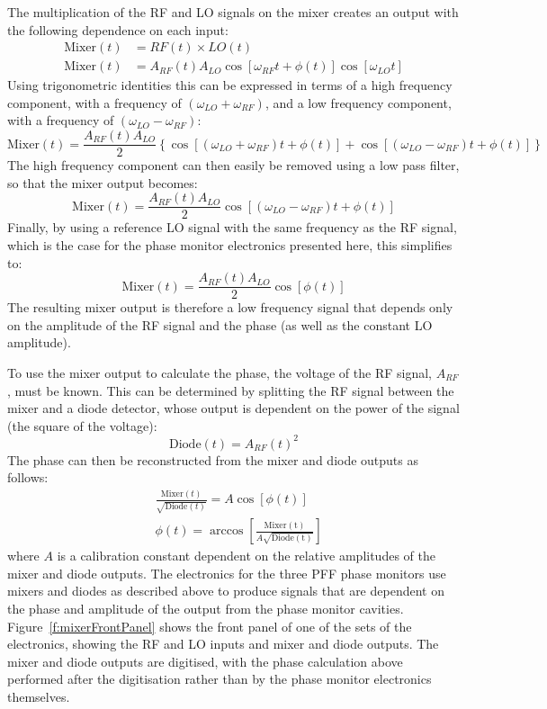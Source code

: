 The multiplication of the RF and LO signals on the mixer creates an output with the following dependence on each input:
\begin{align}
\mathrm{Mixer}(t) &= RF(t) \times LO(t) \\
\mathrm{Mixer}(t) &= A_{RF}(t)A_{LO}\cos[\omega_{RF} t + \phi(t)]\cos[\omega_{LO} t]
\end{align}
Using trigonometric identities this can be expressed in terms of a high frequency component, with a frequency of \((\omega_{LO} + \omega_{RF})\), and a low frequency component, with a frequency of  \((\omega_{LO} - \omega_{RF})\):
\begin{equation}
\mathrm{Mixer}(t) = \frac{A_{RF}(t)A_{LO}}{2}\left\lbrace\cos[(\omega_{LO} + \omega_{RF})t + \phi(t)] + \cos[(\omega_{LO} - \omega_{RF})t + \phi(t)]\right\rbrace
\end{equation}
The high frequency component can then easily be removed using a low pass filter, so that the mixer output becomes:
\begin{equation}
\mathrm{Mixer}(t) = \frac{A_{RF}(t)A_{LO}}{2}\cos[(\omega_{LO} - \omega_{RF})t + \phi(t)]
\label{e:mixOutAnyFreq} 
\end{equation}
Finally, by using a reference LO signal with the same frequency as the RF signal, which is the case for the phase monitor electronics presented here, this simplifies to:
\begin{equation}
\mathrm{Mixer}(t) = \frac{A_{RF}(t)A_{LO}}{2}\cos[\phi(t)]
\label{e:mixOutSameFreq} 
\end{equation}
The resulting mixer output is therefore a low frequency signal that depends only on the amplitude of the RF signal and the phase (as well as the constant LO amplitude).

To use the mixer output to calculate the phase, the voltage of the RF signal, \(A_{RF}\), must  be known. This can be determined by splitting the RF signal between the mixer and a diode detector, whose output is dependent on the power of the signal (the square of the voltage):
\begin{equation}
\mathrm{Diode}(t) = A_{RF}(t)^2
\label{e:idealDiode}
\end{equation}
The phase can then be reconstructed from the mixer and diode outputs as follows:
\begin{align}
&\frac{\mathrm{Mixer}(t)}{\sqrt{\mathrm{Diode}(t)}} = A\cos[\phi(t)] \label{e:mixOverSqrtDio} \\
&\phi(t) = \arccos\left[\frac{\mathrm{Mixer(t)}}{A\sqrt{\mathrm{Diode(t)}}}\right]
\label{e:phaseRecIdeal} 
\end{align}
where \(A\) is a calibration constant dependent on the relative amplitudes of the mixer and diode outputs. The electronics for the three PFF phase monitors use mixers and diodes as described above to produce signals that are dependent on the phase and amplitude of the output from the phase monitor cavities. Figure~\ref{f:mixerFrontPanel} shows the front panel of one of the sets of the electronics, showing the RF and LO inputs and mixer and diode outputs. The mixer and diode outputs are digitised, with the phase calculation above performed after the digitisation rather than by the phase monitor electronics themselves. 

